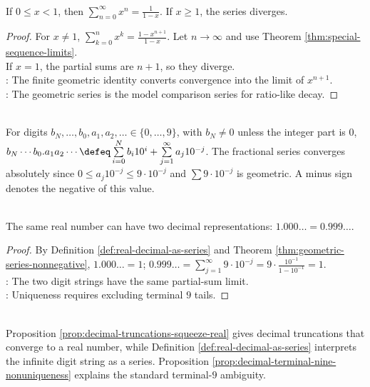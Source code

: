\begin{theorem} \label{thm:geometric-series-nonnegative} \\
If $0\leq x<1$, then $\sum\limits_{n=0}^{\infty}x^n=\frac{1}{1-x}$. If $x\geq1$, the series diverges.
\begin{proof}
For $x\neq1$, $\sum\limits_{k=0}^{n}x^k=\frac{1-x^{n+1}}{1-x}$. Let $n\to\infty$ and use Theorem \ref{thm:special-sequence-limits}.\\
If $x=1$, the partial sums are $n+1$, so they diverge.\\
: The finite geometric identity converts convergence into the limit of $x^{n+1}$.\\
: The geometric series is the model comparison series for ratio-like decay.
\end{proof}
\end{theorem}

\begin{definition} \label{def:real-decimal-as-series} \\
For digits $b_N,\ldots,b_0,a_1,a_2,\ldots\in\{0,\ldots,9\}$, with $b_N\neq0$ unless the integer part is $0$,\\
$b_N\cdots b_0.a_1a_2\cdots \defeq \sum\limits_{i=0}^{N}b_i10^i+\sum\limits_{j=1}^{\infty}a_j10^{-j}$. The fractional series converges absolutely since $0\leq a_j10^{-j}\leq9\cdot10^{-j}$ and $\sum 9\cdot10^{-j}$ is geometric. A minus sign denotes the negative of this value.
\end{definition}

\begin{proposition} \label{prop:decimal-terminal-nine-nonuniqueness} \\
The same real number can have two decimal representations: $1.000\ldots=0.999\ldots$.
\begin{proof}
By Definition \ref{def:real-decimal-as-series} and Theorem \ref{thm:geometric-series-nonnegative}, $1.000\ldots=1$; $0.999\ldots=\sum\limits_{j=1}^{\infty}9\cdot10^{-j} =9\cdot\frac{10^{-1}}{1-10^{-1}}=1$.\\
: The two digit strings have the same partial-sum limit.\\
: Uniqueness requires excluding terminal $9$ tails.
\end{proof}
\end{proposition}

\begin{perspective} \label{per:decimal-expansions-as-series} \\
Proposition \ref{prop:decimal-truncations-squeeze-real} gives decimal truncations that converge to a real number, while Definition \ref{def:real-decimal-as-series} interprets the infinite digit string as a series. Proposition \ref{prop:decimal-terminal-nine-nonuniqueness} explains the standard terminal-$9$ ambiguity.
\end{perspective}


